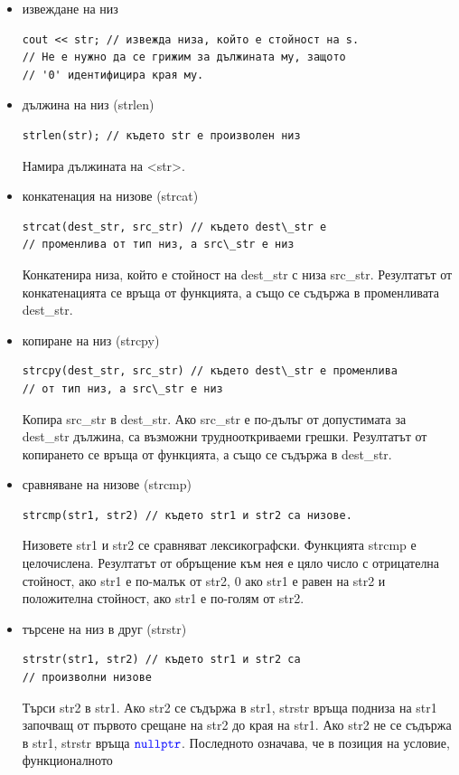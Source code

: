 \documentclass{article}
\begin{document}
\begin{itemize}
    \item извеждане на низ
\begin{lstlisting}[style=cpp]
cout << str; // извежда низа, който е стойност на s.
// Не е нужно да се грижим за дължината му, защото
// '0' идентифицира края му.
\end{lstlisting}
    \item дължина на низ (strlen)
\begin{lstlisting}[style=cpp]
strlen(str); // където str е произволен низ
\end{lstlisting}
Намира дължината на <str>.
    \item конкатенация на низове (strcat)
\begin{lstlisting}[style=cpp]
strcat(dest_str, src_str) // където dest\_str е
// променлива от тип низ, а src\_str е низ
\end{lstlisting}
Конкатенира низа, който е стойност на dest\_str с низа src\_str. Резултатът от конкатенацията се връща от функцията, а също се съдържа
в променливата dest\_str.
    \item копиране на низ (strcpy)
\begin{lstlisting}[style=cpp]
strcpy(dest_str, src_str) // където dest\_str е променлива
// от тип низ, а src\_str е низ
\end{lstlisting}
Копира src\_str в dest\_str. Ако src\_str е по-дълъг от допустимата за dest\_str дължина, са възможни труднооткриваеми грешки. Резултатът от
копирането се връща от функцията, а също се съдържа в dest\_str.
    \item сравняване на низове (strcmp)
\begin{lstlisting}[style=cpp]
strcmp(str1, str2) // където str1 и str2 са низове.
\end{lstlisting}
Низовете str1 и str2 се сравняват лексикографски. Функцията strcmp е целочислена. Резултатът от обръщение към нея е цяло число с
отрицателна стойност, ако str1 е по-малък от str2, 0 ако str1 е равен на str2 и положителна стойност, ако str1 е
по-голям от str2.
    \item търсене на низ в друг (strstr)
\begin{lstlisting}[style=cpp]
strstr(str1, str2) // където str1 и str2 са
// произволни низове
\end{lstlisting}
Търси str2 в str1. Ако str2 се съдържа в str1, strstr връща подниза на str1 започващ от първото срещане на str2 до края
на str1. Ако str2 не се съдържа в str1, strstr връща $\textcolor{blue}{\texttt{nullptr}}$. Последното означава, че в позиция на условие, функционалното

\end{itemize}
\end{document}
